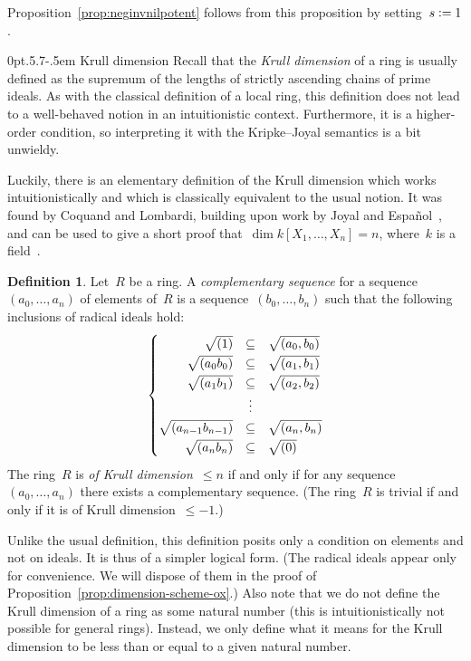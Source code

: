 \documentclass[10pt,reqno,a4paper]{amsbook}
\makeatletter
\theoremstyle{definition}
\newtheorem{defn}{Definition}[section]
\theoremstyle{plain}
\theoremstyle{remark}
\newcommand{\?}{\,{:}\,}
\renewcommand{\_}{\mathpunct{.}\,}
\newcommand{\defeq}{\vcentcolon=}
\def\subsection{\@startsection{subsection}{2}%
  {0pt}{.5\linespacing\@plus.7\linespacing}{-.5em}%
  {\normalfont\bfseries}}
\makeatother
\begin{document}
Proposition~\ref{prop:neginvnilpotent} follows from this proposition by
setting~$s \defeq 1$.


\subsection{Krull dimension}\label{sect:krull-dimension}
Recall that the \emph{Krull dimension} of a
ring is usually defined as the supremum of the lengths of strictly
ascending chains of prime ideals. As with the classical definition of a local ring,
this definition does not lead to a well-behaved notion in an intuitionistic
context. Furthermore, it is a higher-order condition, so interpreting it
with the Kripke--Joyal semantics is a bit unwieldy.

Luckily, there is an elementary definition of the Krull dimension which works
intuitionistically and which is classically equivalent to the usual notion. It
was found by Coquand and Lombardi, building upon work by
Joyal and Español~\cite{dyn:krull-integral,dyn:char-krull}, and can be
used to give a short proof that~$\dim k[X_1,\ldots,X_n] = n$, where~$k$ is a
field~\cite{dyn:krull-dim-polynomial-ring}.

\begin{defn}Let~$R$ be a ring. A \emph{complementary sequence} for a
sequence~$(a_0,\ldots,a_n)$ of elements of~$R$ is a sequence~$(b_0,\ldots,b_n)$
such that the following inclusions of radical ideals hold:
\[ \renewcommand{\arraystretch}{1.3}
\left\{\begin{array}{@{}rcl@{}}
  \sqrt{(1)} &\subseteq& \sqrt{(a_0,b_0)} \\
  \sqrt{(a_0 b_0)} &\subseteq& \sqrt{(a_1,b_1)} \\
  \sqrt{(a_1 b_1)} &\subseteq& \sqrt{(a_2,b_2)} \\
  &\vdots \\
  \sqrt{(a_{n-1} b_{n-1})} &\subseteq& \sqrt{(a_n,b_n)} \\
  \sqrt{(a_n b_n)} &\subseteq& \sqrt{(0)}
\end{array}\right. \]
The ring~$R$ is \emph{of Krull dimension~$\leq n$} if
and only if for any sequence~$(a_0,\ldots,a_n)$ there exists a
complementary sequence. (The ring~$R$ is trivial if and only if it is
of Krull dimension~$\leq -1$.)
\end{defn}
Unlike the usual definition, this definition posits only a condition
on elements and not on ideals. It is thus of a simpler logical form.
(The radical ideals appear only for convenience. We will dispose of them in the
proof of Proposition~\ref{prop:dimension-scheme-ox}.)
Also note that we do not define the Krull dimension of a ring as some natural
number (this is intuitionistically not possible for general rings). Instead, we
only define what it means for the Krull dimension to be less than or equal to
a given natural number.
\end{document}
